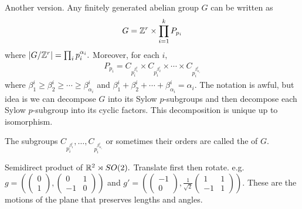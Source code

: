 \documentclass[a4paper]{article}
\begin{document}
Another version. Any finitely generated abelian group $G$ can be written as \begin{align}
    G=\mathbb{Z}^r\times\prod_{i=1}^kP_{p_i}
\end{align}
where $|G/\mathbb{Z}^r|=\prod_i p_i^{\alpha_i}.$ Moreover, for each $i,$ \begin{align}
    P_{p_i}=C_{p_i^{\beta_1^i}}\times C_{p_i^{\beta_2^i}}\times\cdots\times C_{p_i^{\beta_{\alpha_i}^i}}
\end{align}
where $\beta_1^i\geq \beta_2^i\geq\cdots\geq\beta_{\alpha_i}^i$ and $\beta_1^i+\beta_2^i+\cdots+\beta_{\alpha_i}^i=\alpha_i.$
The notation is awful, but idea is we can decompose $G$ into its Sylow $p$-subgroups and then decompose each Sylow $p$-subgroup into its cyclic factors. This decomposition is unique up to isomorphism.

\begin{definition}
    The subgroups $C_{p_i^{\beta_1^i}},\dots,C_{p_i^{\beta_{\alpha_i}^i}}$ or sometimes their orders are called the  of $G.$
\end{definition}

Semidirect product of $\mathbb{R}^2\rtimes SO(2).$ Translate first then rotate. e.g. $g=\left(\begin{pmatrix}
    0\\1
\end{pmatrix},\begin{pmatrix}
    0 & 1\\-1&0
\end{pmatrix}\right)$
and $g'=\left(\begin{pmatrix}
    -1\\0
\end{pmatrix},\frac{1}{\sqrt2}\begin{pmatrix}
    1&1\\-1&1
\end{pmatrix}\right).$ These are the motions of the plane that preserves lengths and angles.
\end{document}
